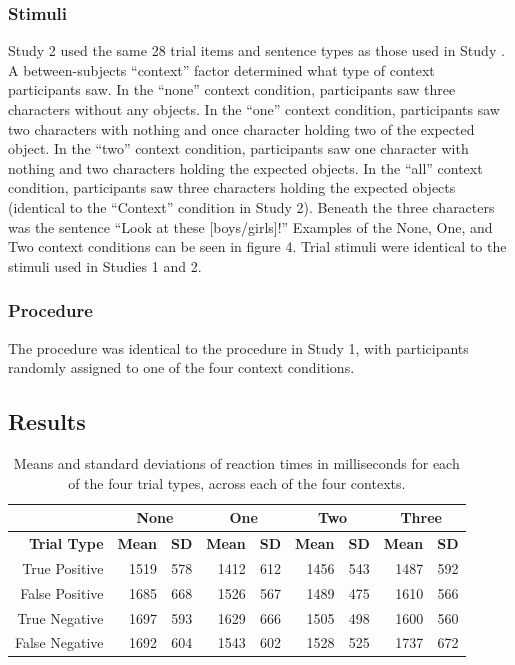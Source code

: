 \documentclass[10pt,letterpaper]{article}
\begin{document}
\subsubsection{Stimuli}
Study 2 used the same 28 trial items and sentence types as those used in Study .  A between-subjects ``context'' factor determined what type of context participants saw.  In the ``none'' context condition, participants saw three characters without any objects.  In the ``one'' context condition, participants saw two characters with nothing and once character holding two of the expected object.  In the ``two'' context condition, participants saw one character with nothing and two characters holding the expected objects.  In the ``all'' context condition, participants saw three characters holding the expected objects (identical to the ``Context'' condition in Study 2).  Beneath the three characters was the sentence ``Look at these [boys/girls]!''  Examples of the None, One, and Two context conditions can be seen in figure 4.  Trial stimuli were identical to the stimuli used in Studies 1 and 2.  

\subsubsection{Procedure}
 The procedure was identical to the procedure in Study 1, with participants randomly assigned to one of the four context conditions.
 
\subsection{Results}

\begin{table}[t]
\caption{Means and standard deviations of reaction times in milliseconds for each of the four trial types, across each of the four contexts.}
\begin{center}
\small\addtolength{\tabcolsep}{-5pt}
\begin{tabular}{ r  r  r  r  r  r  r  r  r} 
\hline
& \multicolumn{2}{c}{\bf{None}} & \multicolumn{2}{c}{\bf{One}}  & \multicolumn{2}{c}{\bf{Two}}  & \multicolumn{2}{c}{\bf{Three}}\\
\hline
  \bf{Trial Type} & \bf{Mean} & \bf{SD} & \bf{Mean} & \bf{SD} & \bf{Mean} & \bf{SD} & \bf{Mean} & \bf{SD} \\ \hline                      
True Positive & 1519 & 578 & 1412 & 612 & 1456 & 543 & 1487 & 592\\
 False Positive & 1685 & 668 & 1526 & 567 & 1489 & 475 & 1610 & 566\\
 True Negative& 1697 & 593 & 1629 & 666 & 1505 & 498 & 1600 & 560\\
  False Negative & 1692 & 604 & 1543 & 602 & 1528 & 525 & 1737 & 672\\
\hline
\end{tabular}
\end{center}
\end{table}
\end{document}

